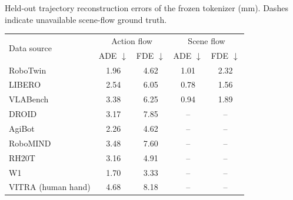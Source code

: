 \begin{center}
\begin{minipage}{0.805\linewidth}
    \makeatletter{}\makeatother
    \centering
    \small
    \setlength{\tabcolsep}{6pt}
    \renewcommand{\arraystretch}{1.12}
    \caption{Held-out trajectory reconstruction errors of the frozen
    \mbox{tokenizer} (mm). Dashes indicate unavailable scene-flow ground truth.}
    \label{tab:app:tokenizer_reconstruction}
    \begin{tabular*}{\linewidth}{@{\extracolsep{\fill}}lcccc@{}}
        \toprule
        \multirow{2}{*}{Data source}
        & \multicolumn{2}{c}{Action flow} & \multicolumn{2}{c}{Scene flow} \\
        \cmidrule(lr){2-3}\cmidrule(lr){4-5}
        & ADE $\downarrow$ & FDE $\downarrow$
        & ADE $\downarrow$ & FDE $\downarrow$ \\
        \midrule
        RoboTwin & 1.96 & 4.62 & 1.01 & 2.32 \\
        LIBERO & 2.54 & 6.05 & 0.78 & 1.56 \\
        VLABench & 3.38 & 6.25 & 0.94 & 1.89 \\
        DROID & 3.17 & 7.85 & -- & -- \\
        AgiBot & 2.26 & 4.62 & -- & -- \\
        RoboMIND & 3.48 & 7.60 & -- & -- \\
        RH20T & 3.16 & 4.91 & -- & -- \\
        W1 & 1.70 & 3.33 & -- & -- \\
        VITRA (human hand) & 4.68 & 8.18 & -- & -- \\
        \bottomrule
    \end{tabular*}
\end{minipage}
\end{center}

